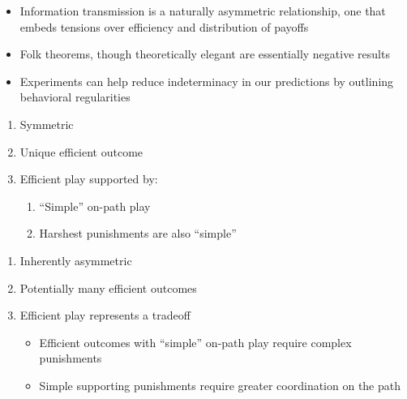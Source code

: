 \documentclass{beamer}
\begin{document}
\begin{frame}
\begin{card}
    \begin{itemize}
        \item Information transmission is a naturally asymmetric relationship, one that embeds tensions over efficiency and distribution of payoffs
        \item Folk theorems, though theoretically elegant are essentially negative results
        \item Experiments can help reduce indeterminacy in our predictions by outlining behavioral regularities
    \end{itemize}
    \end{card}
\end{frame}

\begin{frame}
\begin{card}
\begin{enumerate}
        \item Symmetric
        \item Unique efficient outcome
        \item Efficient play supported by:
            \begin{enumerate}
            \item ``Simple'' on-path play
            \item Harshest punishments are also ``simple''
            \end{enumerate}
    \end{enumerate}
\end{card}
\end{frame}

\begin{frame}
\begin{card}
    \begin{enumerate}
        \item Inherently asymmetric
        \item Potentially many efficient outcomes
        \item Efficient play represents a tradeoff
            \begin{itemize}
            \item Efficient outcomes with ``simple'' on-path play require complex punishments
            \item Simple supporting punishments require greater coordination on the path
            \end{itemize}
    \end{enumerate}
\end{card}
\end{frame}
\end{document}
